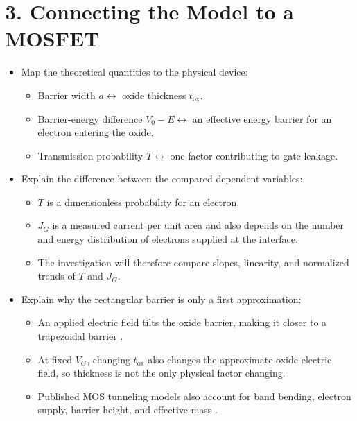 \documentclass[12pt]{article}
\begin{document}
\section*{3. Connecting the Model to a MOSFET}
\begin{itemize}
    \item Map the theoretical quantities to the physical device:
    \begin{itemize}
        \item Barrier width \(a \longleftrightarrow\) oxide thickness \(t_{\mathrm{ox}}\).
        \item Barrier-energy difference \(V_0-E \longleftrightarrow\) an effective energy barrier for an electron entering the oxide.
        \item Transmission probability \(T \longleftrightarrow\) one factor contributing to gate leakage.
    \end{itemize}
    \item Explain the difference between the compared dependent variables:
    \begin{itemize}
        \item \(T\) is a dimensionless probability for an electron.
        \item \(J_G\) is a measured current per unit area and also depends on the number and energy distribution of electrons supplied at the interface.
        \item The investigation will therefore compare slopes, linearity, and normalized trends of \(T\) and \(J_G\).
    \end{itemize}
    \item Explain why the rectangular barrier is only a first approximation:
    \begin{itemize}
        \item An applied electric field tilts the oxide barrier, making it closer to a trapezoidal barrier \cite{simmons1963,green2001review}.
        \item At fixed \(V_G\), changing \(t_{\mathrm{ox}}\) also changes the approximate oxide electric field, so thickness is not the only physical factor changing.
        \item Published MOS tunneling models also account for band bending, electron supply, barrier height, and effective mass \cite{depas1995}.
    \end{itemize}
\end{itemize}
\end{document}
